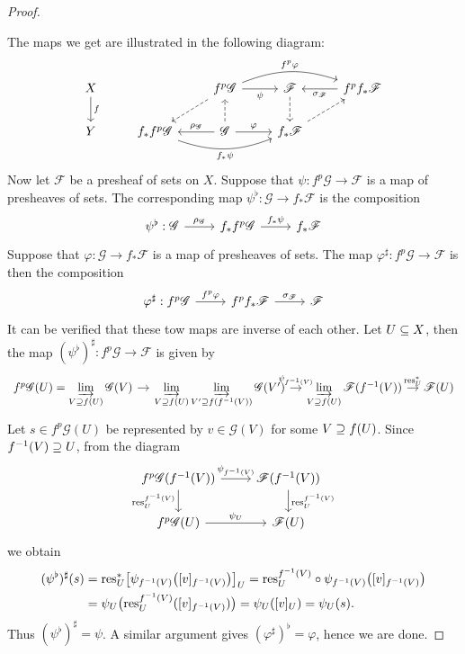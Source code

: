 \begin{proof}
\begin{itemize}
\end{itemize}
The maps we get are illustrated in the following diagram:
\[\begin{tikzcd}
X\ar[d,"f"]&&f^{p}\mathscr{G}\ar[r,swap,"\psi"]\ar[ld,swap,dashed]\ar[rr,bend left=20pt,"f^{p}\varphi"]&\mathscr{F}\ar[d,dashed]&f^{p}f_*\mathscr{F}\ar[l,"\sigma_{\mathscr{F}}"]\\
Y&f_*f^{p}\mathscr{G}\ar[rr,bend right=20pt,swap,"f_*\psi"]&\mathscr{G}\ar[l,swap,"\rho_{\mathscr{G}}"]\ar[u,dashed]\ar[r,"\varphi"]&f_*\mathscr{F}\ar[ru,dashed]
\end{tikzcd}\]
Now let $\mathscr{F}$ be a presheaf of sets on $X$. Suppose that $\psi:f^{p}\mathscr{G}\to\mathscr{F}$ is a map of presheaves of sets. The corresponding map $\psi^{\flat}:\mathscr{G}\to f_*\mathscr{F}$ is the composition
\[\begin{tikzcd}
\psi^\flat:\mathscr{G}\ar[r,"\rho_{\mathscr{G}}"]&f_*f^{p}\mathscr{G}\ar[r,"f_*\psi"]&f_*\mathscr{F}
\end{tikzcd}\]
Suppose that $\varphi:\mathscr{G}\to f_*\mathscr{F}$ is a map of presheaves of sets. The map $\varphi^{\sharp}:f^{p}\mathscr{G}\to\mathscr{F}$ is then the composition
\[\begin{tikzcd}
\varphi^\sharp:f^{p}\mathscr{G}\ar[r,"f^{p}\varphi"]&f^{p}f_*\mathscr{F}\ar[r,"\sigma_{\mathscr{F}}"]&\mathscr{F}
\end{tikzcd}\]
It can be verified that these tow maps are inverse of each other. Let $U\subseteq X$, then the map $(\psi^\flat)^{\sharp}:f^p\mathscr{G}\to\mathscr{F}$ is given by
\[\begin{tikzcd}[column sep=10pt]
f^p\mathscr{G}(U)=\rlim_{V\sups f(U)}\mathscr{G}(V)\ar[r]&\rlim_{V\sups f(U)}\rlim_{V'\sups f(f^{-1}(V))}\mathscr{G}(V')\ar[r,"\psi_{f^{-1}(V)}"]&\rlim_{V\sups f(U)}\mathscr{F}(f^{-1}(V))\ar[r,"\res^*_{U}"]&\mathscr{F}(U)
\end{tikzcd}\]
Let $s\in f^p\mathscr{G}(U)$ be represented by $v\in\mathscr{G}(V)$ for some $V\supseteq f(U)$. Since $f^{-1}(V)\supseteq U$, from the diagram
\[\begin{tikzcd}
f^p\mathscr{G}(f^{-1}(V))\ar[r,"\psi_{f^{-1}(V)}"]\ar[d,swap,"\res^{f^{-1}(V)}_{U}"]&\mathscr{F}(f^{-1}(V))\ar[d,"\res^{f^{-1}(V)}_{U}"]\\
f^p\mathscr{G}(U)\ar[r,"\psi_{U}"]&\mathscr{F}(U)
\end{tikzcd}\]
we obtain
\begin{align*}
(\psi^\flat)^{\sharp}(s)&=\mathrm{res}^*_U\big[\psi_{f^{-1}(V)}\big([v]_{f^{-1}(V)}\big)\big]_U=\mathrm{res}^{f^{-1}(V)}_U\circ\psi_{f^{-1}(V)}\big([v]_{f^{-1}(V)}\big)\\
&=\psi_U\big(\mathrm{res}^{f^{-1}(V)}_U([v]_{f^{-1}(V)})\big)=\psi_U([v]_{U})=\psi_U(s).
\end{align*}
Thus $(\psi^\flat)^\sharp=\psi$. A similar argument gives $(\varphi^\sharp)^\flat=\varphi$, hence we are done.
\end{proof}
